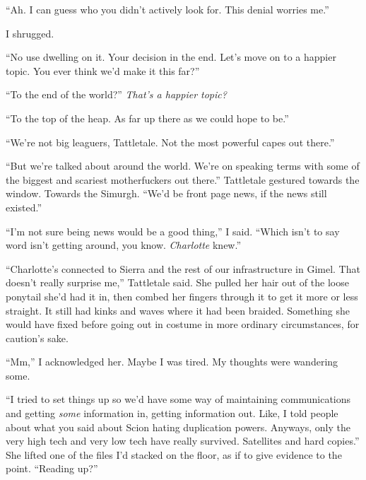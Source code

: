 ``Ah.  I can guess who you didn't actively look for.  This denial worries me.''



I shrugged.



``No use dwelling on it.  Your decision in the end.  Let's move on to a happier topic.  You ever think we'd make it this far?''



``To the end of the world?''  \emph{That's a happier topic?}



``To the top of the heap.  As far up there as we could hope to be.''



``We're not big leaguers, Tattletale.  Not the most powerful capes out there.''



``But we're talked about around the world.  We're on speaking terms with some of the biggest and scariest motherfuckers out there.''  Tattletale gestured towards the window.  Towards the Simurgh.  ``We'd be front page news, if the news still existed.''



``I'm not sure being news would be a good thing,'' I said.  ``Which isn't to say word isn't getting around, you know.  \emph{Charlotte} knew.''



``Charlotte's connected to Sierra and the rest of our infrastructure in Gimel.  That doesn't really surprise me,'' Tattletale said.  She pulled her hair out of the loose ponytail she'd had it in, then combed her fingers through it to get it more or less straight.  It still had kinks and waves where it had been braided.  Something she would have fixed before going out in costume in more ordinary circumstances, for caution's sake.



``Mm,'' I acknowledged her.  Maybe I was tired.  My thoughts were wandering some.



``I tried to set things up so we'd have some way of maintaining communications and getting \emph{some} information in, getting information out.  Like, I told people about what you said about Scion hating duplication powers.  Anyways, only the very high tech and very low tech have really survived.  Satellites and hard copies.''  She lifted one of the files I'd stacked on the floor, as if to give evidence to the point. ``Reading up?''



